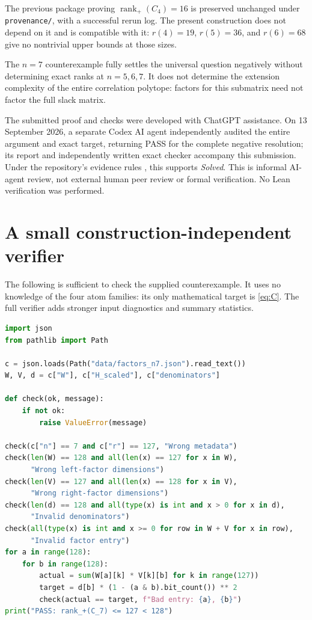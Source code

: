\documentclass[11pt]{article}
\DeclareMathOperator{\rank}{rank}
\newcommand{\rankp}{\rank_{+}}
\newcommand{\code}[1]{\texttt{\small #1}}
\begin{document}
The previous package proving $\rankp(C_4)=16$ is preserved unchanged under \code{provenance/}, with a successful rerun log. The present construction does not depend on it and is compatible with it: $r(4)=19$, $r(5)=36$, and $r(6)=68$ give no nontrivial upper bounds at those sizes.

The $n=7$ counterexample fully settles the universal question negatively without determining exact ranks at $n=5,6,7$. It does not determine the extension complexity of the entire correlation polytope: factors for this submatrix need not factor the full slack matrix.

The submitted proof and checks were developed with ChatGPT assistance. On 13 September 2026, a separate Codex AI agent independently audited the entire argument and exact target, returning PASS for the complete negative resolution; its report and independently written exact checker accompany this submission. Under the repository's evidence rules \cite{status}, this supports \emph{Solved}. This is informal AI-agent review, not external human peer review or formal verification. No Lean verification was performed.

\newpage
\appendix
\section{A small construction-independent verifier}

The following is sufficient to check the supplied counterexample. It uses no knowledge of the four atom families: its only mathematical target is \eqref{eq:C}. The full verifier adds stronger input diagnostics and summary statistics.

\begin{lstlisting}[language=Python]
import json
from pathlib import Path

c = json.loads(Path("data/factors_n7.json").read_text())
W, V, d = c["W"], c["H_scaled"], c["denominators"]

def check(ok, message):
    if not ok:
        raise ValueError(message)

check(c["n"] == 7 and c["r"] == 127, "Wrong metadata")
check(len(W) == 128 and all(len(x) == 127 for x in W),
      "Wrong left-factor dimensions")
check(len(V) == 127 and all(len(x) == 128 for x in V),
      "Wrong right-factor dimensions")
check(len(d) == 128 and all(type(x) is int and x > 0 for x in d),
      "Invalid denominators")
check(all(type(x) is int and x >= 0 for row in W + V for x in row),
      "Invalid factor entry")
for a in range(128):
    for b in range(128):
        actual = sum(W[a][k] * V[k][b] for k in range(127))
        target = d[b] * (1 - (a & b).bit_count()) ** 2
        check(actual == target, f"Bad entry: {a}, {b}")
print("PASS: rank_+(C_7) <= 127 < 128")
\end{lstlisting}
\end{document}

